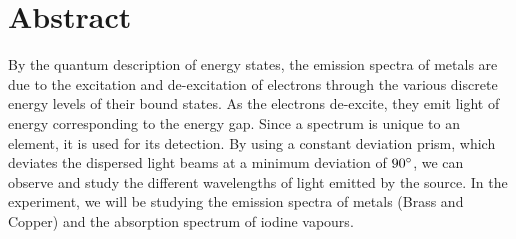 \section{Abstract} 
By the quantum description of energy states, the emission spectra of metals are due to the excitation and de-excitation of electrons through the various discrete energy levels of their bound states. As the electrons de-excite, they emit light of energy corresponding to the energy gap. Since a spectrum is unique to an element, it is used for its detection. By using a constant deviation prism, which deviates the dispersed light beams at a minimum deviation of $90 \degree$, we can observe and study the different wavelengths of light emitted by the source. In the experiment, we will be studying the emission spectra of metals (Brass and Copper) and the absorption spectrum of iodine vapours.

